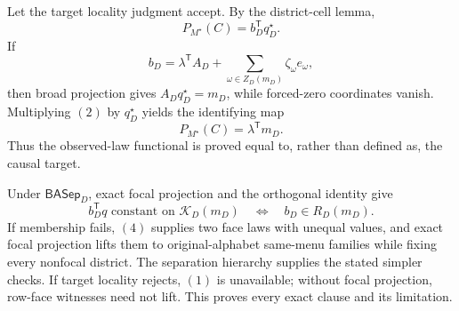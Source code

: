 Let the target locality judgment accept.  By the district-cell lemma,
\[
P_{M^\star}(C)=b_D^{\mathsf T}q_D^\star.
\tag{1}
\]
If
\[
b_D=\lambda^{\mathsf T}A_D+
\sum_{\omega\in Z_D(m_D)}\zeta_\omega e_\omega,
\tag{2}
\]
then broad projection gives \(A_Dq_D^\star=m_D\), while forced-zero coordinates vanish.  Multiplying \((2)\) by \(q_D^\star\) yields the identifying map
\[
P_{M^\star}(C)=\lambda^{\mathsf T}m_D.
\tag{3}
\]
Thus the observed-law functional is proved equal to, rather than defined as, the causal target.

Under \(\mathsf{BASep}_D\), exact focal projection and the orthogonal identity give
\[
b_D^{\mathsf T}q\text{ constant on }\mathcal K_D(m_D)
\quad\Longleftrightarrow\quad b_D\in R_D(m_D).
\tag{4}
\]
If membership fails, \((4)\) supplies two face laws with unequal values, and exact focal projection lifts them to original-alphabet same-menu families while fixing every nonfocal district.  The separation hierarchy supplies the stated simpler checks.  If target locality rejects, \((1)\) is unavailable; without focal projection, row-face witnesses need not lift.  This proves every exact clause and its limitation.
